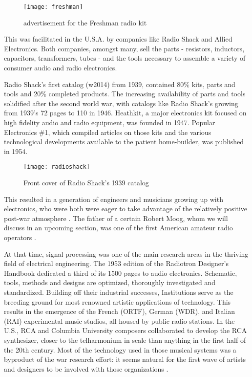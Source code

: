 	\begin{figure}[h!]
	  \caption{advertisement for the Freshman radio kit}
	  \centering
	    \texttt{[image: freshman]}
	\end{figure}

This was facilitated in the U.S.A. by companies like Radio Shack and Allied Electronics. Both companies, amongst many, sell the parts - resistors, inductors, capacitors, transformers, tubes - and the tools necessary to assemble a variety of consumer audio and radio electronics. 

Radio Shack’s first catalog (w2014) from 1939, contained 80\% kits, parts and tools and 20\% completed products. The increasing availability of parts and tools solidified after the second world war, with catalogs like Radio Shack’s growing from 1939’s 72 pages to 110 in 1946. Heathkit, a major electronics kit focused on high fidelity audio and radio equipment, was founded in 1947. Popular Electronics \#1, which compiled articles on those kits and the various technological developments available to the patient home-builder, was published in 1954. 

	\begin{figure}[h!]
	  \caption{Front cover of Radio Shack's 1939 catalog}
	  \centering
	    \texttt{[image: radioshack]}
	\end{figure}

This resulted in a generation of engineers and musicians growing up with electronics, who were both were eager to take advantage of the relatively positive post-war atmosphere \cite{holmes2002}. The father of a certain Robert Moog, whom we will discuss in an upcoming section, was one of the first American amateur radio operators \cite[p.12]{pinch2002}. 

At that time, signal processing was one of the main research areas in the thriving field of electrical engineering. The 1953 edition of the Radiotron Designer's Handbook \cite{langford1953} dedicated a third of its 1500 pages to audio electronics. Schematic, tools, methods and designs are optimized, thoroughly investigated and standardized. Building off their industrial successes, Institutions serve as the breeding ground for most renowned artistic applications of technology. This results in the emergence of the French (ORTF), German (WDR), and Italian (RAI) experimental music studios, all housed by public radio stations. In the U.S., RCA and Columbia University composers collaborated to develop the RCA synthesizer, closer to the telharmonium in scale than anything in the first half of the 20th century. Most of the technology used in those musical systems was a byproduct of the war research effort: it seems natural for the first wave of artists and designers to be involved with those organizations \cite[p.81]{holmes2002}. 

